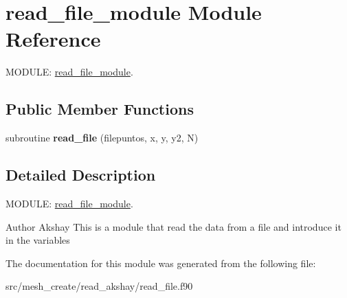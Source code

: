 \hypertarget{classread__file__module}{\section{read\-\_\-file\-\_\-module Module Reference}
\label{classread__file__module}
}


M\-O\-D\-U\-L\-E\-: \hyperlink{classread__file__module}{read\-\_\-file\-\_\-module}.  


\subsection*{Public Member Functions}
\begin{DoxyCompactItemize}
\item 
\hypertarget{classread__file__module_a0b8e2e0a98d5213ca7d38f3d91e787fa}{subroutine {\bfseries read\-\_\-file} (filepuntos, x, y, y2, N)}\label{classread__file__module_a0b8e2e0a98d5213ca7d38f3d91e787fa}

\end{DoxyCompactItemize}


\subsection{Detailed Description}
M\-O\-D\-U\-L\-E\-: \hyperlink{classread__file__module}{read\-\_\-file\-\_\-module}. 

\begin{DoxyAuthor}{Author}
Akshay This is a module that read the data from a file and introduce it in the variables 
\end{DoxyAuthor}


The documentation for this module was generated from the following file\-:\begin{DoxyCompactItemize}
\item 
src/mesh\-\_\-create/read\-\_\-akshay/read\-\_\-file.\-f90\end{DoxyCompactItemize}
